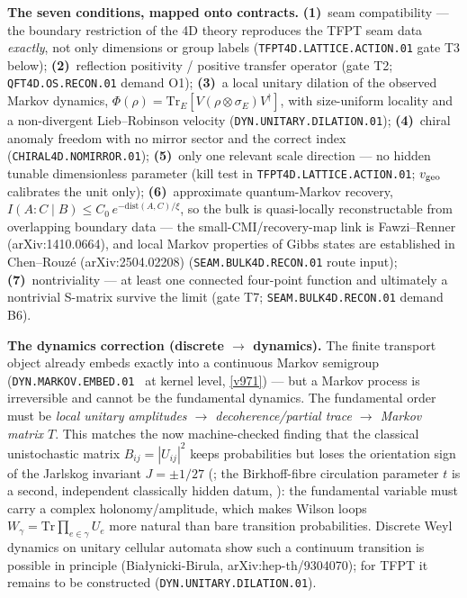 \documentclass[11pt,a4paper]{article}
\begin{document}
\par\smallskip\noindent\textbf{The seven conditions, mapped onto contracts.}
\textbf{(1)}~seam compatibility --- the boundary restriction of the 4D theory reproduces the
TFPT seam data \emph{exactly}, not only dimensions or group labels
(\texttt{TFPT4D.LATTICE.ACTION.01} gate T3 below);
\textbf{(2)}~reflection positivity / positive transfer operator (gate T2;
\texttt{QFT4D.OS.RECON.01} demand O1);
\textbf{(3)}~a local unitary dilation of the observed Markov dynamics,
$\Phi(\rho)=\mathrm{Tr}_E[V(\rho\otimes\sigma_E)V^\dagger]$, with size-uniform locality and a
non-divergent Lieb--Robinson velocity (\texttt{DYN.UNITARY.DILATION.01});
\textbf{(4)}~chiral anomaly freedom with no mirror sector and the correct index
(\texttt{CHIRAL4D.NOMIRROR.01});
\textbf{(5)}~only one relevant scale direction --- no hidden tunable dimensionless parameter
(kill test in \texttt{TFPT4D.LATTICE.ACTION.01}; $v_{\rm geo}$ calibrates the unit only);
\textbf{(6)}~approximate quantum-Markov recovery,
$I(A{:}C\mid B)\le C_0\,e^{-\mathrm{dist}(A,C)/\xi}$, so the bulk is quasi-locally
reconstructable from overlapping boundary data --- the small-CMI/recovery-map link is
Fawzi--Renner (arXiv:1410.0664), and local Markov properties of Gibbs states are established in
Chen--Rouz\'e (arXiv:2504.02208) (\texttt{SEAM.BULK4D.RECON.01} route input);
\textbf{(7)}~nontriviality --- at least one connected four-point function and ultimately a
nontrivial S-matrix survive the limit (gate T7; \texttt{SEAM.BULK4D.RECON.01} demand B6).

\par\smallskip\noindent\textbf{The dynamics correction (discrete $\to$ dynamics).}  The finite
transport object already embeds exactly into a continuous Markov semigroup
(\texttt{DYN.MARKOV.EMBED.01} \mE\ at kernel level, \vref{v971}) --- but a Markov process is
irreversible and cannot be the fundamental dynamics.  The fundamental order must be
\emph{local unitary amplitudes $\to$ decoherence/partial trace $\to$ Markov matrix $T$}.  This
matches the now machine-checked finding that the classical unistochastic matrix $B_{ij}=|U_{ij}|^2$
keeps probabilities but loses the orientation sign of the Jarlskog invariant $J=\pm1/27$
(; the Birkhoff-fibre circulation parameter $t$ is a
second, independent classically hidden datum, ): the fundamental
variable must carry a complex
holonomy/amplitude, which makes Wilson loops $W_\gamma=\mathrm{Tr}\prod_{e\in\gamma}U_e$ more
natural than bare transition probabilities.  Discrete Weyl dynamics on unitary cellular automata
show such a continuum transition is possible in principle (Bia\l ynicki-Birula,
arXiv:hep-th/9304070); for TFPT it remains to be constructed
(\texttt{DYN.UNITARY.DILATION.01}).
\end{document}
